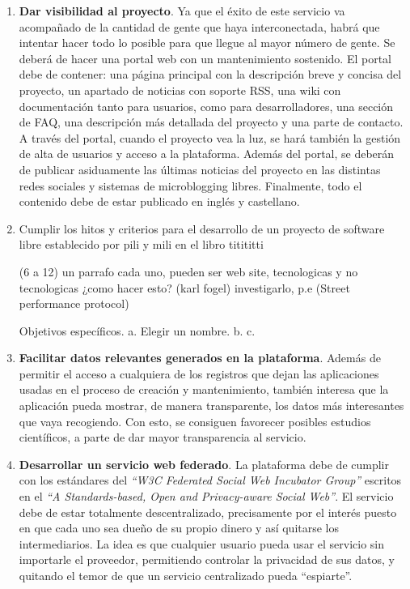 \begin{enumerate}{Subobjetivos:}
\item\textbf{Dar visibilidad al proyecto}. Ya que el éxito de este servicio va acompañado de la cantidad de gente que haya interconectada, habrá que intentar hacer todo lo posible para que llegue al mayor número de gente. Se deberá de hacer una portal web con un mantenimiento sostenido. El portal debe de contener: una página principal con la descripción breve y concisa del proyecto, un apartado de noticias con soporte RSS, una wiki con documentación tanto para usuarios, como para desarrolladores, una sección de FAQ, una descripción más detallada del proyecto y una parte de contacto. A través del portal, cuando el proyecto vea la luz, se hará también la gestión de alta de usuarios y acceso a la plataforma. Además del portal, se deberán de publicar asiduamente las últimas noticias del proyecto en las distintas redes sociales y sistemas de microblogging libres. Finalmente, todo el contenido debe de estar publicado en inglés y castellano.

\item Cumplir los hitos y criterios para el desarrollo de un proyecto de software libre establecido por  pili y mili en el libro titititti
 
(6 a 12) un parrafo cada uno, pueden ser web site, tecnologicas y no tecnologicas ¿como hacer esto? (karl fogel) investigarlo, p.e (Street performance protocol)

Objetivos específicos.
a. Elegir un nombre.
b. 
c. 
\item \textbf{Facilitar datos relevantes generados en la plataforma}. Además de permitir el acceso a cualquiera de los registros que dejan las aplicaciones usadas en el proceso de creación y mantenimiento, también interesa que la aplicación pueda mostrar, de manera transparente, los datos más interesantes que vaya recogiendo. Con esto, se consiguen favorecer posibles estudios científicos, a parte de dar mayor transparencia al servicio.

\item \textbf{Desarrollar un servicio web federado}. La plataforma debe de cumplir con los estándares del \textit{``W3C Federated Social Web Incubator Group''} escritos en el \textit{``A Standards-based, Open and Privacy-aware Social Web''}. El servicio debe de estar totalmente descentralizado, precisamente por el interés puesto en que cada uno sea dueño de su propio dinero y así quitarse los intermediarios. La idea es que cualquier usuario pueda usar el servicio sin importarle el proveedor, permitiendo controlar la privacidad de sus datos, y quitando el temor de que un servicio centralizado pueda ``espiarte''. 


\end{enumerate}
